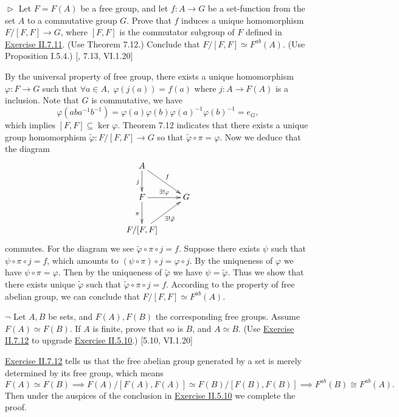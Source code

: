 \documentclass[12pt,letterpaper,boxed]{hmcpset}
\begin{document}
\hypertarget{Exercise II.7.12}{}
\begin{problem}[7.12]
$\vartriangleright$ Let $F = F(A)$ be a free group, and let $f : A\to G$ be a set-function
from the set $A$ to a commutative group $G$. Prove that $f$ induces a unique homomorphism $F/[F, F]\to G$, where $[F, F]$ is the commutator subgroup of $F$ defined in \hyperlink{Exercise II.7.11}{Exercise II.7.11}. (Use Theorem 7.12.) Conclude that $F/[F, F]\simeq F^{ab}(A)$. (Use Proposition I.5.4.) [, 7.13, VI.1.20]
\end{problem}
\begin{solution}
By the universal property of free group, there exists a unique homomorphism $\varphi:F\to G$ such that $\forall a\in A,\;\varphi(j(a))=f(a)$ 
where $j:A\to F(A)$ is a inclusion. Note that $G$ is commutative, we have
\[
\varphi(aba^{-1}b^{-1})=\varphi(a)\varphi(b)\varphi(a)^{-1}\varphi(b)^{-1}=e_G,
\]
which implies $[F,F]\subseteq \ker\varphi$. Theorem 7.12 indicates that there exists a unique group homomorphism $\tilde{\varphi}:F/[F, F]\to G$ so that $\tilde{\varphi}\circ\pi=\varphi$. Now we deduce that the diagram
\[\xymatrix{
	A\ar@{->}[d]_{j}\ar@{->}[rd]^{f} \\
	F\ar@{->}[r]^{\exists!\varphi}\ar@{->}[d]_{\pi} & G\\
	F/[F,F]\ar@{->}[ru]_{\exists!\tilde{\varphi}}  
}\]
commutes. For the diagram we see $\tilde{\varphi}\circ\pi\circ j=f$. Suppose there exists $\psi$ such that $\psi\circ\pi\circ j=f$, which amounts to $(\psi\circ\pi)\circ j=\varphi\circ j$. By the uniqueness of $\varphi$ we have $\psi\circ\pi=\varphi$. Then by the uniqueness of $\tilde{\varphi}$ we have $\psi=\tilde{\varphi}$. Thus we show that there exists unique $\tilde{\varphi}$ such that $\tilde{\varphi}\circ\pi\circ j=f$. According to the property of free abelian group, we can conclude that $F/[F, F]\simeq F^{ab}(A)$.
\end{solution}

\begin{problem}[7.13]
$\neg$ Let $A, B$ be sets, and $F(A), F(B)$ the corresponding free groups. Assume $F(A)\simeq F(B)$. If $A$ is finite, prove that so is $B$, and $A\simeq B$. (Use \hyperlink{Exercise II.7.12}{Exercise II.7.12} to upgrade \hyperlink{Exercise II.5.10}{Exercise II.5.10}.) [5.10, VI.1.20]
\end{problem}
\begin{solution}
\hyperlink{Exercise II.7.12}{Exercise II.7.12} tells us that the free abelian group generated by a set is merely determined by its free group, which means
\[
F(A)\simeq F(B)\implies F(A)/[F(A),F(A)]\simeq F(B)/[F(B),F(B)]\implies F^{ab}(B)\cong F^{ab}(A).
\]
Then under the auspices of the conclusion in \hyperlink{Exercise II.5.10}{Exercise II.5.10} we complete the proof.
\end{solution}
\end{document}
